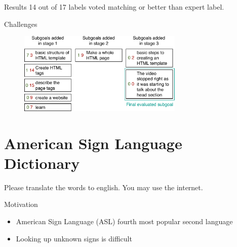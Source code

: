 
	\begin{frame}{Results}
		14 out of 17 labels voted matching or better than expert label.
	\end{frame}

	\begin{frame}{Challenges}
		\begin{figure}
			\centering
			\includegraphics[width=0.7\textwidth]{images/subgoal-worsened}
		\end{figure}
	\end{frame}


\section{American Sign Language Dictionary}

	\begin{frame}[standout]
		Please translate the words to english. You may use the internet.
	\end{frame}


	\begin{frame}{Motivation}
		\begin{itemize}
			\item<+-> American Sign Language (ASL) fourth most popular second language
			\item<+-> Looking up unknown signs is difficult 
		\end{itemize}
	\end{frame}

